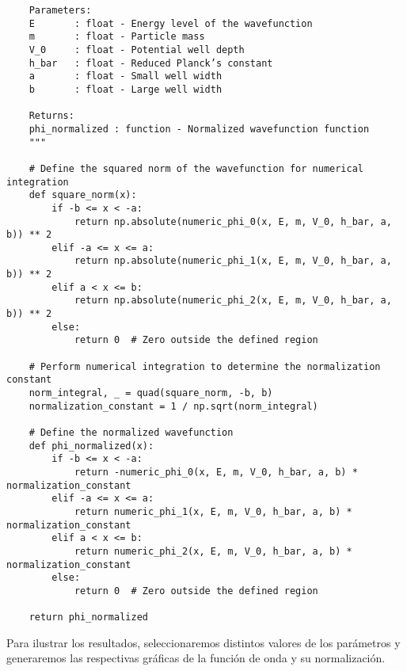 \documentclass[11pt]{article}
\begin{document}
\begin{verbatim}
    Parameters:
    E       : float - Energy level of the wavefunction
    m       : float - Particle mass
    V_0     : float - Potential well depth
    h_bar   : float - Reduced Planck’s constant
    a       : float - Small well width
    b       : float - Large well width

    Returns:
    phi_normalized : function - Normalized wavefunction function
    """

    # Define the squared norm of the wavefunction for numerical integration
    def square_norm(x):
        if -b <= x < -a:
            return np.absolute(numeric_phi_0(x, E, m, V_0, h_bar, a, b)) ** 2
        elif -a <= x <= a:
            return np.absolute(numeric_phi_1(x, E, m, V_0, h_bar, a, b)) ** 2
        elif a < x <= b:
            return np.absolute(numeric_phi_2(x, E, m, V_0, h_bar, a, b)) ** 2
        else:
            return 0  # Zero outside the defined region

    # Perform numerical integration to determine the normalization constant
    norm_integral, _ = quad(square_norm, -b, b)
    normalization_constant = 1 / np.sqrt(norm_integral)

    # Define the normalized wavefunction
    def phi_normalized(x):
        if -b <= x < -a:
            return -numeric_phi_0(x, E, m, V_0, h_bar, a, b) * normalization_constant
        elif -a <= x <= a:
            return numeric_phi_1(x, E, m, V_0, h_bar, a, b) * normalization_constant
        elif a < x <= b:
            return numeric_phi_2(x, E, m, V_0, h_bar, a, b) * normalization_constant
        else:
            return 0  # Zero outside the defined region

    return phi_normalized
\end{verbatim}

Para ilustrar los resultados, seleccionaremos distintos valores de los
parámetros y generaremos las respectivas gráficas de la función de onda
y su normalización.
\end{document}
